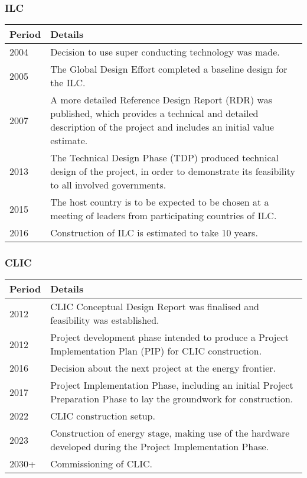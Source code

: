 \subsubsection{ILC}

\begin{tabularx}{\textwidth}{l | X}
  Period & Details \\
  \hline
  2004 & Decision to use super conducting technology was made. \\
  2005 & The Global Design Effort completed a baseline design for the ILC. \\
  2007 & A more detailed Reference Design Report (RDR) was published, which provides a technical and detailed description of the project and includes an initial value estimate. \\
  2013 & The Technical Design Phase (TDP) produced technical design of the project, in order to demonstrate its feasibility to all involved governments. \\
  2015 & The host country is to be expected to be chosen at a meeting of leaders from participating countries of ILC. \\
  2016\textendash 26 & Construction of ILC is estimated to take 10 years. \\
\end{tabularx}
    
\subsubsection{CLIC}

\begin{tabularx}{\textwidth}{l | X}
    Period & Details \\
    \hline 
    2012 & CLIC Conceptual Design Report was finalised and feasibility was established. \\
    2012\textendash 16 & Project development phase intended to produce a Project Implementation Plan (PIP) for CLIC construction. \\
    2016\textendash 17 & Decision about the next project at the energy frontier. \\
    2017\textendash 22 & Project Implementation Phase, including an initial Project Preparation Phase to lay the groundwork for construction. \\
    2022\textendash 23 & CLIC construction setup. \\
    2023\textendash 30 & Construction of energy stage, making use of the hardware developed during the Project Implementation Phase. \\
    2030+ & Commissioning of CLIC. \\
\end{tabularx}